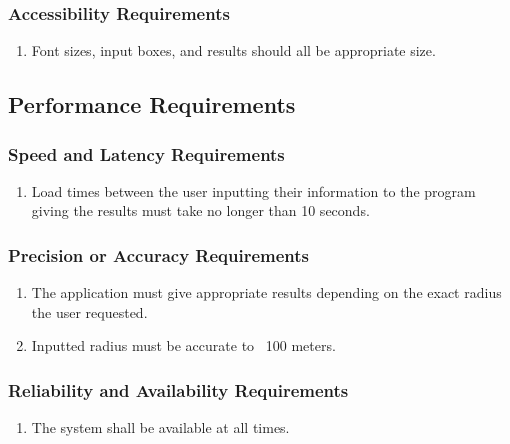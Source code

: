 \documentclass[english]{article}
\begin{document}
\subsubsection{Accessibility Requirements}
\label{ssub:accessibility_requirements}
\begin{enumerate}[{ACR}1. ]
\item Font sizes, input boxes, and results should all be appropriate size. 
\end{enumerate}


\subsection{Performance Requirements}
\label{sub:performance_requirements}

\subsubsection{Speed and Latency Requirements}
\label{ssub:speed_and_latency_requirements}
\begin{enumerate}[{SLR}1. ]
\item Load times between the user inputting their information to the program giving the results must take no longer than 10 seconds. 
\end{enumerate}

\subsubsection{Precision or Accuracy Requirements}
\label{ssub:precision_or_accuracy_requirements}
\begin{enumerate}[{PAR}1. ]
\item The application must give appropriate results depending on the exact radius the user requested. 

\item Inputted radius must be accurate to ~100 meters. 
\end{enumerate}

\subsubsection{Reliability and Availability Requirements}
\label{ssub:reliability_and_availability_requirements}
\begin{enumerate}[{RAR}1. ]
\item The system shall be available at all times.
\end{enumerate}
\end{document}
